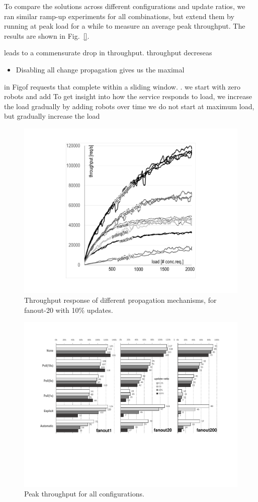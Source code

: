 To compare the solutions across different configurations and update ratios, we ran similar ramp-up experiments for all combinations, but extend them by running at peak load for a while to measure an average  peak throughput. The results are shown in Fig.~\ref{}. 

  leads to a commensurate drop in throughput.  throughput decreseas
\begin{itemize}
\item Disabling all change propagation gives us the maximal 
\end{itemize}

  in Figof requests that complete within a sliding window. . we start with zero robots and add 
To get insight into how the service responds to load, we increase the load gradually by adding robots over time we do not start at maximum load, but gradually increase the load 


\begin{figure}
\noindent
\centering
\includegraphics[width=\columnwidth, viewport=164 80 633 531]{figs/tp-curves} 
\caption{Throughput response of different propagation mechanisms, for fanout-20 with 10\% updates.}\label{fig:tp-curves}
\end{figure}

\begin{figure}
\noindent
\centering
\includegraphics[width=\textwidth, viewport=58 201 726 550]{figs/tp-all} 
\caption{Peak throughput for all configurations.}\label{fig:tp-all}
\end{figure}

